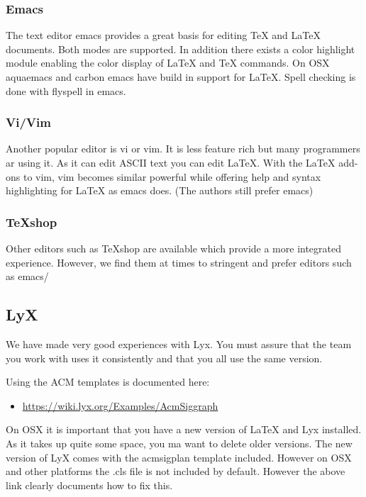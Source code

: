 \subsubsection{Emacs}\label{emacs}

The text editor emacs provides a great basis for editing TeX and LaTeX
documents. Both modes are supported. In addition there exists a color
highlight module enabling the color display of LaTeX and TeX commands.
On OSX aquaemacs and carbon emacs have build in support for LaTeX. Spell
checking is done with flyspell in emacs.

\subsubsection{Vi/Vim}\label{vivim}

Another popular editor is vi or vim. It is less feature rich but many
programmers ar using it. As it can edit ASCII text you can edit LaTeX.
With the LaTeX add-ons to vim, vim becomes similar powerful while
offering help and syntax highlighting for LaTeX as emacs does. (The
authors still prefer emacs)

\subsubsection{TeXshop}\label{texshop}

Other editors such as TeXshop are available which provide a more
integrated experience. However, we find them at times to stringent and
prefer editors such as emacs/

\subsection{LyX}\label{lyx}

We have made very good experiences with Lyx. You must assure that the
team you work with uses it consistently and that you all use the same
version.

Using the ACM templates is documented here:

\begin{itemize}
\tightlist
\item
  \url{https://wiki.lyx.org/Examples/AcmSiggraph}
\end{itemize}

On OSX it is important that you have a new version of LaTeX and Lyx
installed. As it takes up quite some space, you ma want to delete older
versions. The new version of LyX comes with the acmsigplan template
included. However on OSX and other platforms the .cls file is not
included by default. However the above link clearly documents how to fix
this.

